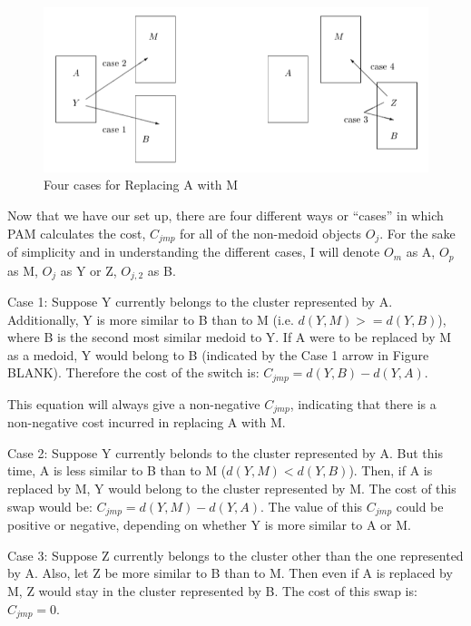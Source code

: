 \documentclass[12pt,twoside]{amherstthesis}
\begin{document}
  \begin{figure}[htbp]
  \centering
  \includegraphics[scale = 0.5,angle = 0]{PAM_pic.png}
  \caption[Four cases for Replacing A with M]{\normalsize{Four cases for Replacing A with M}}
  \label{fig:PAM}
  \end{figure}
  
  Now that we have our set up, there are four different ways or ``cases''
  in which PAM calculates the cost, \(C_{jmp}\) for all of the non-medoid
  objects \(O_j\). For the sake of simplicity and in understanding the
  different cases, I will denote \(O_m\) as A, \(O_p\) as M, \(O_j\) as Y
  or Z, \(O_{j,2}\) as B.
  
  Case 1: Suppose Y currently belongs to the cluster represented by A.
  Additionally, Y is more similar to B than to M (i.e.
  \(d(Y, M) >= d(Y, B)\)), where B is the second most similar medoid to Y.
  If A were to be replaced by M as a medoid, Y would belong to B
  (indicated by the Case 1 arrow in Figure BLANK). Therefore the cost of
  the switch is: \(C_{jmp} = d(Y, B) - d(Y, A)\).
  
  This equation will always give a non-negative \(C_{jmp}\), indicating
  that there is a non-negative cost incurred in replacing A with M.
  
  Case 2: Suppose Y currently belonds to the cluster represented by A. But
  this time, A is less similar to B than to M (\(d(Y, M) < d(Y, B)\)).
  Then, if A is replaced by M, Y would belong to the cluster represented
  by M. The cost of this swap would be: \(C_{jmp} = d(Y, M) - d(Y, A)\).
  The value of this \(C_{jmp}\) could be positive or negative, depending
  on whether Y is more similar to A or M.
  
  Case 3: Suppose Z currently belongs to the cluster other than the one
  represented by A. Also, let Z be more similar to B than to M. Then even
  if A is replaced by M, Z would stay in the cluster represented by B. The
  cost of this swap is: \(C_{jmp} = 0\).
  
\end{document}
